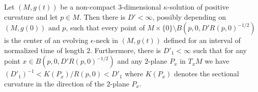 \begin{lemma}\label{lem:noncompact-kappa-solution-neck-structure}
Let $(M,g(t))$ be a non-compact $3$-dimensional $\kappa$-solution of
positive curvature and let $p\in M$. Then there is $D'<\infty$,
possibly depending on $(M,g(0))$ and $p$, such that every point of
$M\times\{0\}\setminus B(p,0,D'R(p,0)^{-1/2})$ is the center of an
evolving $\epsilon$-neck in $(M,g(t))$ defined for an interval of
normalized time of length  $2$. Furthermore, there is $D'_1<\infty$
such that for any point $x\in B(p,0,D'R(p,0)^{-1/2})$ and any
$2$-plane $P_x$ in $T_xM$
 we have $(D'_1)^{-1}< K(P_x)/R(p,0)< D'_1$ where $K(P_x)$ denotes the sectional
 curvature in the direction of the $2$-plane $P_x$.
\end{lemma}

